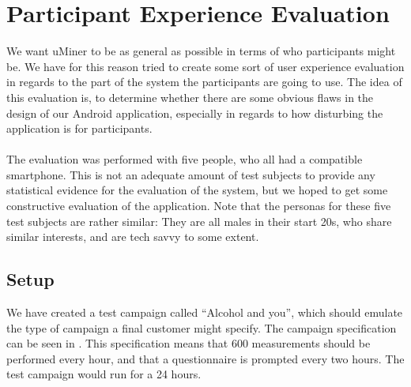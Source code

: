 \section{Participant Experience Evaluation}
\label{sec:participant_experience_evaluation}

We want uMiner to be as general as possible in terms of who participants might be. We have for this reason tried to create some sort of user experience evaluation in regards to the part of the system the participants are going to use. The idea of this evaluation is, to determine whether there are some obvious flaws in the design of our Android application, especially in regards to how disturbing the application is for participants. 
\\\\
The evaluation was performed with five people, who all had a compatible smartphone. This is not an adequate amount of test subjects to provide any statistical evidence for the evaluation of the system, but we hoped to get some constructive evaluation of the application. Note that the personas for these five test subjects are rather similar: They are all males in their start 20s, who share similar interests, and are tech savvy to some extent.

\subsection{Setup}
\label{sub:setup}

We have created a test campaign called ``Alcohol and you'', which should emulate the type of campaign a final customer might specify. The campaign specification can be seen in . This specification means that 600 measurements should be performed every hour, and that a questionnaire is prompted every two hours. The test campaign would run for a 24 hours. 

